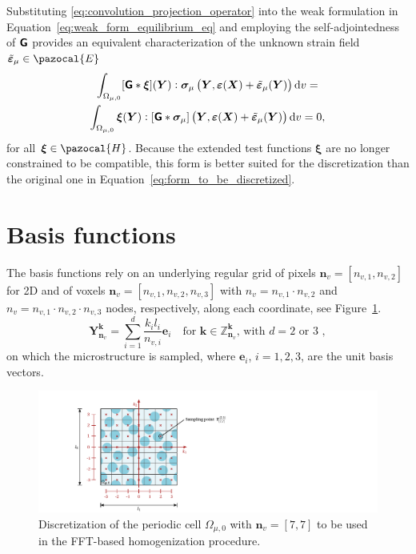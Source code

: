 Substituting \eqref{eq:convolution_projection_operator} into the weak formulation in Equation~\eqref{eq:weak_form_equilibrium_eq} and employing the self-adjointedness of \(\boldsymbol{\mathsf{G}}\) provides an equivalent characterization of the unknown strain field \(\tilde{\bm \varepsilon}_\mu \in \pazocal{E}\)
\begin{multline} \label{eq:form_to_be_discretized}
\int_{\Omega_{\mu,0}}[\boldsymbol{\mathsf{G}} * \bm{\xi}](\bm{Y}): \bm{\sigma}_\mu\left(\bm{Y}, \bm \varepsilon(\bm X)+\tilde{\bm\varepsilon}_\mu(\bm Y)\right) \mathrm{d} v=\\ \int_{\Omega_{\mu,0}}
\bm \xi(\bm Y): [\boldsymbol{\mathsf{G}} * \bm{\sigma}_\mu]\left(\bm Y, \bm \varepsilon(\bm X)+\tilde{\bm\varepsilon}_\mu(\bm{Y})\right) \mathrm{d} v=0,
\end{multline}
for all \(\bm \xi \in \pazocal{H}\).
Because the extended test functions \(\bm \xi\) are no longer constrained to be compatible, this form is better suited for the discretization than the original one in Equation~\eqref{eq:form_to_be_discretized}.

\section{Basis functions}

The basis functions rely on an underlying regular grid of pixels \(\bm n_v = [n_{v,1}, n_{v,2}]\) for 2D and of voxels \(\bm n_v = [n_{v,1}, n_{v,2}, n_{v,3}]\) with \(n_v= n_{v,1} \cdot n_{v,2}\) and \(n_v=n_{v,1}\cdot n_{v,2}\cdot n_{v,3}\) nodes, respectively, along each coordinate, see Figure~\ref{fig:fft_discretization}.
\begin{equation}
\bm Y_{\bm n_v}^{\bm  k}=\sum_{i=1}^d \frac{ k_{i} l_{i}}{n_{v,i}} \bm e_{i}\quad \text{for \(\bm k \in \mathbb Z^{\bm k}_{\bm n_v}\), with \(d=2\) or 3 },
\end{equation}
on which the microstructure is sampled, where \(\bm e_i\), \(i=1,2,3\), are the unit basis vectors.

\begin{figure}[htbp]
  \includegraphics{figures/fft_discretization}
  \caption{Discretization of the periodic cell \(\Omega_{\mu,0}\) with \(\bm n_v = [7,7]\) to be used in the FFT-based homogenization procedure.}
\label{fig:fft_discretization}
\end{figure}


